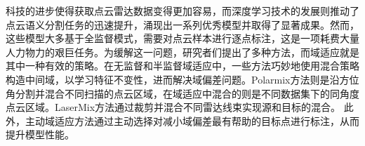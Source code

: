     科技的进步使得获取点云雷达数据变得更加容易，而深度学习技术的发展则推动了点云语义分割任务的迅速提升，涌现出一系列优秀模型并取得了显著成果。然而，这些模型大多基于全监督模式，需要对点云样本进行逐点标注，这是一项耗费大量人力物力的艰巨任务。为缓解这一问题，研究者们提出了多种方法，而域适应就是其中一种有效的策略。在无监督和半监督域适应中，一些方法巧妙地使用混合策略构造中间域，以学习特征不变性，进而解决域偏差问题。Polarmix方法则是沿方位角分割并混合不同扫描的点云区域，在域适应中混合的则是不同数据集下的同角度点云区域。LaserMix方法通过裁剪并混合不同雷达线束实现源和目标的混合。
    此外，主动域适应方法通过主动选择对减小域偏差最有帮助的目标点进行标注，从而提升模型性能。 

